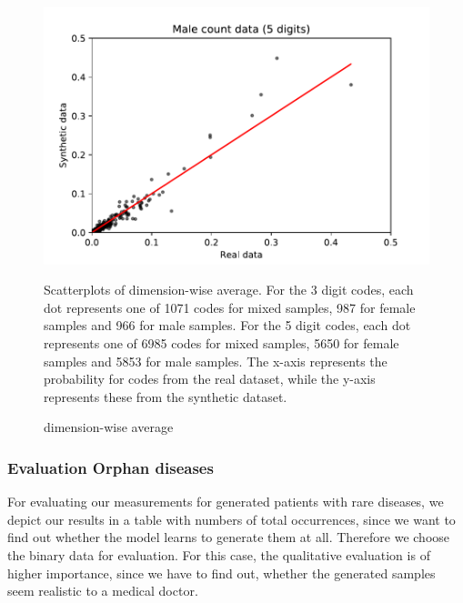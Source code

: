 \documentclass[11pt, a4paper]{book}
\begin{document}
\begin{figure}
\includegraphics[width=.3\textwidth]{img/plots/count_5digit_male}\hfill
\caption{dimension-wise average}
\small
\begin{flushleft}
Scatterplots of dimension-wise average. For the 3 digit codes, each dot represents one of 1071 codes for mixed samples, 987 for female samples and 966 for male samples. For the 5 digit codes, each dot represents one of 6985 codes for mixed samples, 5650 for female samples and 5853 for male samples. The x-axis represents the probability for codes from the real dataset, while the y-axis represents these from the synthetic dataset.
\end{flushleft}
\label{fig:figure3}
\end{figure}

\subsubsection{Evaluation Orphan diseases}
For evaluating our measurements for generated patients with rare diseases, we depict our results in a table with numbers of total occurrences, since we want to find out whether the model learns to generate them at all. 
Therefore we choose the binary data for evaluation.
For this case, the qualitative evaluation is of higher importance, since we have to find out, whether the generated samples seem realistic to a medical doctor.
\end{document}
